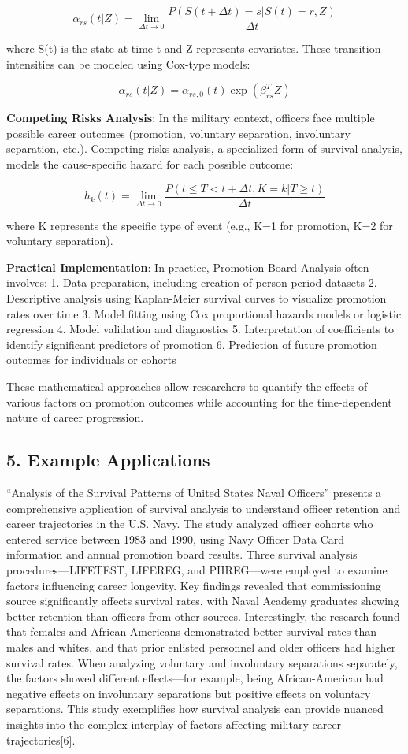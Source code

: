 \documentclass[
  letterpaper,
  DIV=11,
  numbers=noendperiod]{scrartcl}
\begin{document}
\[ \alpha_{rs}(t|Z) = \lim_{\Delta t \to 0} \frac{P(S(t + \Delta t) = s | S(t) = r, Z)}{\Delta t} \]

where S(t) is the state at time t and Z represents covariates. These
transition intensities can be modeled using Cox-type models:

\[ \alpha_{rs}(t|Z) = \alpha_{rs,0}(t) \exp(\beta_{rs}^T Z) \]

\textbf{Competing Risks Analysis}: In the military context, officers
face multiple possible career outcomes (promotion, voluntary separation,
involuntary separation, etc.). Competing risks analysis, a specialized
form of survival analysis, models the cause-specific hazard for each
possible outcome:

\[ h_k(t) = \lim_{\Delta t \to 0} \frac{P(t \leq T < t + \Delta t, K = k | T \geq t)}{\Delta t} \]

where K represents the specific type of event (e.g., K=1 for promotion,
K=2 for voluntary separation).

\textbf{Practical Implementation}: In practice, Promotion Board Analysis
often involves: 1. Data preparation, including creation of person-period
datasets 2. Descriptive analysis using Kaplan-Meier survival curves to
visualize promotion rates over time 3. Model fitting using Cox
proportional hazards models or logistic regression 4. Model validation
and diagnostics 5. Interpretation of coefficients to identify
significant predictors of promotion 6. Prediction of future promotion
outcomes for individuals or cohorts

These mathematical approaches allow researchers to quantify the effects
of various factors on promotion outcomes while accounting for the
time-dependent nature of career progression.

\subsection{5. Example Applications}\label{example-applications}

``Analysis of the Survival Patterns of United States Naval Officers''
presents a comprehensive application of survival analysis to understand
officer retention and career trajectories in the U.S. Navy. The study
analyzed officer cohorts who entered service between 1983 and 1990,
using Navy Officer Data Card information and annual promotion board
results. Three survival analysis procedures---LIFETEST, LIFEREG, and
PHREG---were employed to examine factors influencing career longevity.
Key findings revealed that commissioning source significantly affects
survival rates, with Naval Academy graduates showing better retention
than officers from other sources. Interestingly, the research found that
females and African-Americans demonstrated better survival rates than
males and whites, and that prior enlisted personnel and older officers
had higher survival rates. When analyzing voluntary and involuntary
separations separately, the factors showed different effects---for
example, being African-American had negative effects on involuntary
separations but positive effects on voluntary separations. This study
exemplifies how survival analysis can provide nuanced insights into the
complex interplay of factors affecting military career
trajectories{[}6{]}.
\end{document}
